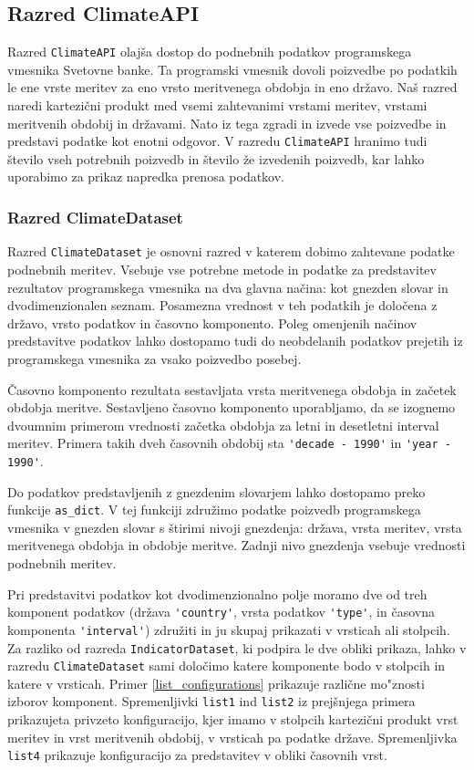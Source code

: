 \subsection{Razred ClimateAPI}

Razred \verb|ClimateAPI| olajša dostop do podnebnih podatkov programskega
vmesnika Svetovne banke. Ta programski vmesnik dovoli poizvedbe po podatkih le 
ene vrste meritev za eno vrsto meritvenega obdobja in eno državo. Naš razred 
naredi kartezični produkt med vsemi zahtevanimi vrstami meritev, vrstami
meritvenih obdobij in državami. Nato iz tega zgradi in izvede vse poizvedbe 
in predstavi podatke kot enotni odgovor. V razredu \verb|ClimateAPI| hranimo 
tudi število vseh potrebnih poizvedb in število že izvedenih poizvedb, kar 
lahko uporabimo za prikaz napredka prenosa podatkov.



\subsubsection{Razred ClimateDataset}

Razred \verb|ClimateDataset| je osnovni razred v katerem dobimo zahtevane 
podatke podnebnih meritev. Vsebuje vse potrebne metode in podatke za 
predstavitev rezultatov programskega vmesnika na dva glavna načina: kot
gnezden slovar in dvodimenzionalen seznam. Posamezna vrednost v teh podatkih
je določena z državo, vrsto podatkov in časovno komponento. Poleg omenjenih
načinov predstavitve podatkov lahko dostopamo tudi do neobdelanih podatkov 
prejetih iz programskega vmesnika za vsako poizvedbo posebej.

Časovno komponento rezultata sestavljata vrsta meritvenega obdobja in 
začetek obdobja meritve. Sestavljeno časovno komponento uporabljamo, da se 
izognemo dvoumnim primerom vrednosti začetka obdobja za letni in desetletni 
interval meritev. Primera takih dveh časovnih obdobij sta 
\verb|'decade - 1990'| in \verb|'year - 1990'|.


Do podatkov predstavljenih z gnezdenim slovarjem lahko dostopamo preko funkcije
\verb|as_dict|. V tej funkciji združimo podatke poizvedb programskega
vmesnika v gnezden slovar s štirimi nivoji gnezdenja: država, vrsta meritev,
vrsta meritvenega obdobja in obdobje meritve. Zadnji nivo gnezdenja vsebuje
vrednosti podnebnih meritev.

Pri predstavitvi podatkov kot dvodimenzionalno polje moramo dve od treh
komponent podatkov (država \verb|'country'|, vrsta podatkov \verb|'type'|, 
in časovna komponenta \verb|'interval'|)
združiti in ju skupaj prikazati v vrsticah ali stolpcih. Za razliko od razreda
\verb|IndicatorDataset|, ki podpira le dve obliki prikaza, lahko v razredu
\verb|ClimateDataset| sami določimo katere komponente bodo v stolpcih in
katere v vrsticah. Primer \ref{list_configurations} prikazuje različne mo"znosti izborov komponent.
Spremenljivki \verb|list1| ind \verb|list2| iz
prejšnjega primera prikazujeta privzeto konfiguracijo, kjer imamo v stolpcih
kartezični produkt vrst meritev in vrst meritvenih obdobij, v vrsticah pa
podatke države. Spremenljivka \verb|list4| prikazuje konfiguracijo za
predstavitev v obliki časovnih vrst.

